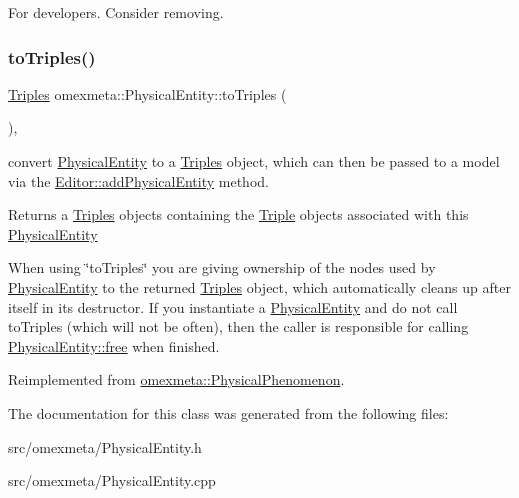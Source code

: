 For developers. Consider removing. \mbox{\label{classomexmeta_1_1PhysicalEntity_a51f5df8b2e8a1d65e5aa0d10e53b77ba}} 
\subsubsection{\texorpdfstring{to\+Triples()}{toTriples()}}
{\footnotesize\ttfamily \hyperlink{classomexmeta_1_1Triples}{Triples} omexmeta\+::\+Physical\+Entity\+::to\+Triples (\begin{DoxyParamCaption}{ }\end{DoxyParamCaption})\hspace{0.3cm}{\ttfamily [override]}, {\ttfamily [virtual]}}



convert \hyperlink{classomexmeta_1_1PhysicalEntity}{Physical\+Entity} to a \hyperlink{classomexmeta_1_1Triples}{Triples} object, which can then be passed to a model via the \hyperlink{classomexmeta_1_1Editor_a0740831baafe244374ad7a324d51a87e}{Editor\+::add\+Physical\+Entity} method. 

\begin{DoxyReturn}{Returns}
a \hyperlink{classomexmeta_1_1Triples}{Triples} objects containing the \hyperlink{classomexmeta_1_1Triple}{Triple} objects associated with this \hyperlink{classomexmeta_1_1PhysicalEntity}{Physical\+Entity}
\end{DoxyReturn}
When using \char`\"{}to\+Triples\char`\"{} you are giving ownership of the nodes used by \hyperlink{classomexmeta_1_1PhysicalEntity}{Physical\+Entity} to the returned \hyperlink{classomexmeta_1_1Triples}{Triples} object, which automatically cleans up after itself in its destructor. If you instantiate a \hyperlink{classomexmeta_1_1PhysicalEntity}{Physical\+Entity} and do not call to\+Triples (which will not be often), then the caller is responsible for calling \hyperlink{classomexmeta_1_1PhysicalEntity_a6fd4acd7255a01322c4a53d3e84df0ba}{Physical\+Entity\+::free} when finished. 

Reimplemented from \hyperlink{classomexmeta_1_1PhysicalPhenomenon}{omexmeta\+::\+Physical\+Phenomenon}.



The documentation for this class was generated from the following files\+:\begin{DoxyCompactItemize}
\item 
src/omexmeta/Physical\+Entity.\+h\item 
src/omexmeta/Physical\+Entity.\+cpp\end{DoxyCompactItemize}
